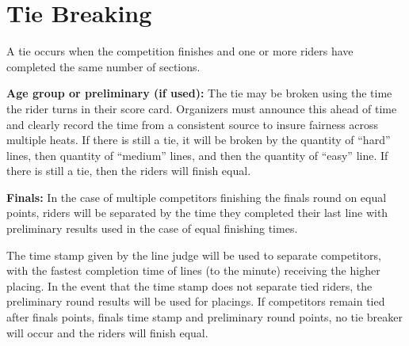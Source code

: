 \section{Tie Breaking}
A tie occurs when the competition finishes and one or more riders have completed the same number of sections.

\textbf{Age group or preliminary (if used):} The tie may be broken using the time the rider turns in their score card.
Organizers must announce this ahead of time and clearly record the time from a consistent source to insure fairness across multiple heats.
If there is still a tie, it will be broken by the quantity of ``hard'' lines, then quantity of ``medium'' lines, and then the quantity of ``easy'' line.
If there is still a tie, then the riders will finish equal.

\textbf{Finals:} In the case of multiple competitors finishing the finals round on equal points, riders will be separated by the time they completed their last line with preliminary results used in the case of equal finishing times.

The time stamp given by the line judge will be used to separate competitors, with the fastest completion time of lines (to the minute) receiving the higher placing.
In the event that the time stamp does not separate tied riders, the preliminary round results will be used for placings.
If competitors remain tied after finals points, finals time stamp and preliminary round points, no tie breaker will occur and the riders will finish equal.
